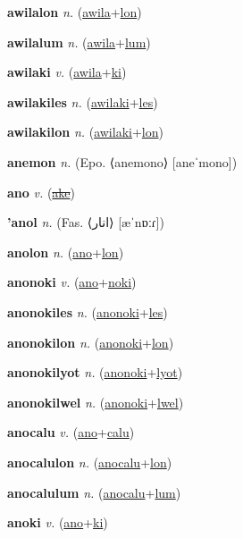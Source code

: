 \textbf{\hypertarget{awilalon}{awilalon}} \textit{n.} (\hyperlink{awila}{awila}+\allowbreak \hyperlink{lon}{lon})


\textbf{\hypertarget{awilalum}{awilalum}} \textit{n.} (\hyperlink{awila}{awila}+\allowbreak \hyperlink{lum}{lum})


\textbf{\hypertarget{awilaki}{awilaki}} \textit{v.} (\hyperlink{awila}{awila}+\allowbreak \hyperlink{ki}{ki})


\textbf{\hypertarget{awilakiles}{awilakiles}} \textit{n.} (\hyperlink{awilaki}{awilaki}+\allowbreak \hyperlink{les}{les})


\textbf{\hypertarget{awilakilon}{awilakilon}} \textit{n.} (\hyperlink{awilaki}{awilaki}+\allowbreak \hyperlink{lon}{lon})


\textbf{\hypertarget{anemon}{anemon}} \textit{n.} (Epo. ⟨anemono⟩ [aneˈmono])


\textbf{\hypertarget{ano}{ano}} \textit{v.} (\hyperlink{ake}{\sout{ake}})


\textbf{\hypertarget{'anol}{'anol}} \textit{n.} (Fas. ⟨{\arabics{}انار}⟩ [æˈnɒːɾ])


\textbf{\hypertarget{anolon}{anolon}} \textit{n.} (\hyperlink{ano}{ano}+\allowbreak \hyperlink{lon}{lon})


\textbf{\hypertarget{anonoki}{anonoki}} \textit{v.} (\hyperlink{ano}{ano}+\allowbreak \hyperlink{noki}{noki})


\textbf{\hypertarget{anonokiles}{anonokiles}} \textit{n.} (\hyperlink{anonoki}{anonoki}+\allowbreak \hyperlink{les}{les})


\textbf{\hypertarget{anonokilon}{anonokilon}} \textit{n.} (\hyperlink{anonoki}{anonoki}+\allowbreak \hyperlink{lon}{lon})


\textbf{\hypertarget{anonokilyot}{anonokilyot}} \textit{n.} (\hyperlink{anonoki}{anonoki}+\allowbreak \hyperlink{lyot}{lyot})


\textbf{\hypertarget{anonokilwel}{anonokilwel}} \textit{n.} (\hyperlink{anonoki}{anonoki}+\allowbreak \hyperlink{lwel}{lwel})


\textbf{\hypertarget{anocalu}{anocalu}} \textit{v.} (\hyperlink{ano}{ano}+\allowbreak \hyperlink{calu}{calu})


\textbf{\hypertarget{anocalulon}{anocalulon}} \textit{n.} (\hyperlink{anocalu}{anocalu}+\allowbreak \hyperlink{lon}{lon})


\textbf{\hypertarget{anocalulum}{anocalulum}} \textit{n.} (\hyperlink{anocalu}{anocalu}+\allowbreak \hyperlink{lum}{lum})


\textbf{\hypertarget{anoki}{anoki}} \textit{v.} (\hyperlink{ano}{ano}+\allowbreak \hyperlink{ki}{ki})


